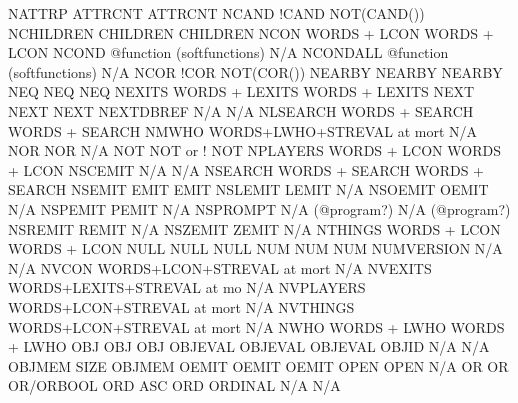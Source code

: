 \documentclass[letterpaper,10pt,english]{sphinxmanual}
\begin{document}
\begin{sphinxVerbatim}[commandchars=\\\{\}]
NATTRP                  ATTRCNT                      ATTRCNT
NCAND                   !CAND                        NOT(CAND())
NCHILDREN               CHILDREN                     CHILDREN
NCON                    WORDS + LCON                 WORDS + LCON
NCOND                   @function (softfunctions)    N/A
NCONDALL                @function (softfunctions)    N/A
NCOR                    !COR                         NOT(COR())
NEARBY                  NEARBY                       NEARBY
NEQ                     NEQ                          NEQ
NEXITS                  WORDS + LEXITS               WORDS + LEXITS
NEXT                    NEXT                         NEXT
NEXTDBREF               N/A                          N/A
NLSEARCH                WORDS + SEARCH               WORDS + SEARCH
NMWHO                   WORDS+LWHO+STREVAL at mort   N/A
NOR                     NOR                          N/A
NOT                     NOT or !                     NOT
NPLAYERS                WORDS + LCON                 WORDS + LCON
NSCEMIT                 N/A                          N/A
NSEARCH                 WORDS + SEARCH               WORDS + SEARCH
NSEMIT                  EMIT                         EMIT
NSLEMIT                 LEMIT                        N/A
NSOEMIT                 OEMIT                        N/A
NSPEMIT                 PEMIT                        N/A
NSPROMPT                N/A (@program?)              N/A (@program?)
NSREMIT                 REMIT                        N/A
NSZEMIT                 ZEMIT                        N/A
NTHINGS                 WORDS + LCON                 WORDS + LCON
NULL                    NULL                         NULL
NUM                     NUM                          NUM
NUMVERSION              N/A                          N/A
NVCON                   WORDS+LCON+STREVAL at mort   N/A
NVEXITS                 WORDS+LEXITS+STREVAL at mo   N/A
NVPLAYERS               WORDS+LCON+STREVAL at mort   N/A
NVTHINGS                WORDS+LCON+STREVAL at mort   N/A
NWHO                    WORDS + LWHO                 WORDS + LWHO
OBJ                     OBJ                          OBJ
OBJEVAL                 OBJEVAL                      OBJEVAL
OBJID                   N/A                          N/A
OBJMEM                  SIZE                         OBJMEM
OEMIT                   OEMIT                        OEMIT
OPEN                    OPEN                         N/A
OR                      OR                           OR/ORBOOL
ORD                     ASC                          ORD
ORDINAL                 N/A                          N/A

\end{sphinxVerbatim}
\end{document}
